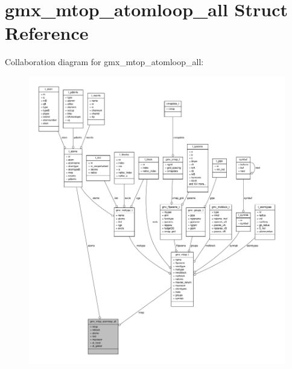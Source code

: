 \hypertarget{structgmx__mtop__atomloop__all}{\section{gmx\-\_\-mtop\-\_\-atomloop\-\_\-all \-Struct \-Reference}
\label{structgmx__mtop__atomloop__all}
}


\-Collaboration diagram for gmx\-\_\-mtop\-\_\-atomloop\-\_\-all\-:
\nopagebreak
\begin{figure}[H]
\begin{center}
\leavevmode
\includegraphics[width=350pt]{structgmx__mtop__atomloop__all__coll__graph}
\end{center}
\end{figure}
